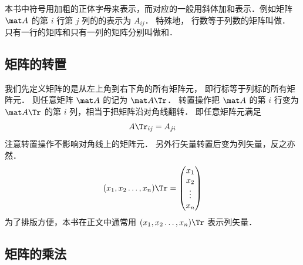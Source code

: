 

本书中符号用加粗的正体字母来表示，而对应的一般用斜体加和表示．例如矩阵 $\mat A$ 的第 $i$ 行第 $j$ 列的的表示为 $A_{ij}$． 特殊地， 行数等于列数的矩阵叫做． 只有一行的矩阵和只有一列的矩阵分别叫做和．

\subsection{矩阵的转置}

我们先定义矩阵的是从左上角到右下角的所有矩阵元， 即行标等于列标的所有矩阵元． 则任意矩阵 $\mat A$ 的记为 $\mat A\Tr$． 转置操作把 $\mat A$ 的第 $i$ 行变为 $\mat A\Tr$ 的第 $i$ 列，相当于把矩阵沿对角线翻转． 即任意矩阵元满足
\begin{equation}
A\Tr_{ij} = A_{ji}
\end{equation}
注意转置操作不影响对角线上的矩阵元． 另外行矢量转置后变为列矢量，反之亦然．
\begin{equation}\label{Mat_eq2}
(x_1,x_2 \dots, x_n)\Tr = \begin{pmatrix} x_1\\x_2\\ \vdots\\x_n \end{pmatrix}
\end{equation}
为了排版方便，本书在正文中通常用 $(x_1,x_2 \dots, x_n)\Tr$ 表示列矢量．

\subsection{矩阵的乘法}

